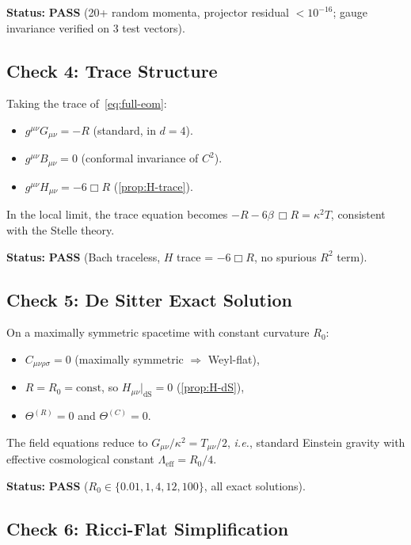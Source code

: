 \documentclass[11pt,a4paper]{article}
\newcommand{\ie}{\textit{i.e.}}
\theoremstyle{plain}
\theoremstyle{definition}
\begin{document}
\noindent\textbf{Status:} \textcolor{green!50!black}{\textbf{PASS}}
(20+ random momenta, projector residual $< 10^{-16}$;
gauge invariance verified on 3 test vectors).

\subsection{Check 4: Trace Structure}

Taking the trace of~\eqref{eq:full-eom}:
\begin{itemize}[nosep]
  \item $g^{\mu\nu}G_{\mu\nu} = -R$ (standard, in $d = 4$).
  \item $g^{\mu\nu}B_{\mu\nu} = 0$ (conformal invariance of $C^2$).
  \item $g^{\mu\nu}H_{\mu\nu} = -6\Box R$ (\cref{prop:H-trace}).
\end{itemize}
In the local limit, the trace equation becomes
$-R - 6\beta\,\Box R = \kappa^2 T$, consistent with the Stelle theory.

\noindent\textbf{Status:} \textcolor{green!50!black}{\textbf{PASS}}
(Bach traceless, $H$ trace = $-6\Box R$, no spurious $R^2$ term).

\subsection{Check 5: De Sitter Exact Solution}

On a maximally symmetric spacetime with constant curvature $R_0$:
\begin{itemize}[nosep]
  \item $C_{\mu\nu\rho\sigma} = 0$ (maximally symmetric $\Rightarrow$ Weyl-flat),
  \item $R = R_0 = \mathrm{const}$, so $H_{\mu\nu}|_{\mathrm{dS}} = 0$
    (\cref{prop:H-dS}),
  \item $\Theta^{(R)} = 0$ and $\Theta^{(C)} = 0$.
\end{itemize}
The field equations reduce to $G_{\mu\nu}/\kappa^2 = T_{\mu\nu}/2$,
\ie, standard Einstein gravity with effective cosmological constant
$\Lambda_{\mathrm{eff}} = R_0/4$.

\noindent\textbf{Status:} \textcolor{green!50!black}{\textbf{PASS}}
($R_0 \in \{0.01, 1, 4, 12, 100\}$, all exact solutions).

\subsection{Check 6: Ricci-Flat Simplification}
\end{document}
